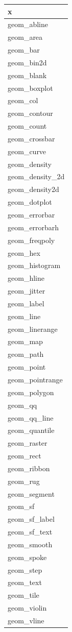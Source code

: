 \documentclass[]{krantz}
\begin{document}
\begin{tabular}{l}
\hline
x\\
\hline
geom\_abline\\
\hline
geom\_area\\
\hline
geom\_bar\\
\hline
geom\_bin2d\\
\hline
geom\_blank\\
\hline
geom\_boxplot\\
\hline
geom\_col\\
\hline
geom\_contour\\
\hline
geom\_count\\
\hline
geom\_crossbar\\
\hline
geom\_curve\\
\hline
geom\_density\\
\hline
geom\_density\_2d\\
\hline
geom\_density2d\\
\hline
geom\_dotplot\\
\hline
geom\_errorbar\\
\hline
geom\_errorbarh\\
\hline
geom\_freqpoly\\
\hline
geom\_hex\\
\hline
geom\_histogram\\
\hline
geom\_hline\\
\hline
geom\_jitter\\
\hline
geom\_label\\
\hline
geom\_line\\
\hline
geom\_linerange\\
\hline
geom\_map\\
\hline
geom\_path\\
\hline
geom\_point\\
\hline
geom\_pointrange\\
\hline
geom\_polygon\\
\hline
geom\_qq\\
\hline
geom\_qq\_line\\
\hline
geom\_quantile\\
\hline
geom\_raster\\
\hline
geom\_rect\\
\hline
geom\_ribbon\\
\hline
geom\_rug\\
\hline
geom\_segment\\
\hline
geom\_sf\\
\hline
geom\_sf\_label\\
\hline
geom\_sf\_text\\
\hline
geom\_smooth\\
\hline
geom\_spoke\\
\hline
geom\_step\\
\hline
geom\_text\\
\hline
geom\_tile\\
\hline
geom\_violin\\
\hline
geom\_vline\\
\hline
\end{tabular}
\end{document}
